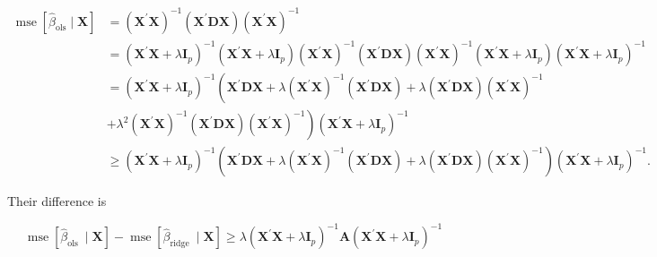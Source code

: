 \documentclass[10pt]{article}
\begin{document}
$$
\begin{aligned}
\operatorname{mse}\left[\widehat{\beta}_{\mathrm{ols}} \mid \boldsymbol{X}\right] &=\left(\boldsymbol{X}^{\prime} \boldsymbol{X}\right)^{-1}\left(\boldsymbol{X}^{\prime} \boldsymbol{D} \boldsymbol{X}\right)\left(\boldsymbol{X}^{\prime} \boldsymbol{X}\right)^{-1} \\
&=\left(\boldsymbol{X}^{\prime} \boldsymbol{X}+\lambda \boldsymbol{I}_{p}\right)^{-1}\left(\boldsymbol{X}^{\prime} \boldsymbol{X}+\lambda \boldsymbol{I}_{p}\right)\left(\boldsymbol{X}^{\prime} \boldsymbol{X}\right)^{-1}\left(\boldsymbol{X}^{\prime} \boldsymbol{D} \boldsymbol{X}\right)\left(\boldsymbol{X}^{\prime} \boldsymbol{X}\right)^{-1}\left(\boldsymbol{X}^{\prime} \boldsymbol{X}+\lambda \boldsymbol{I}_{p}\right)\left(\boldsymbol{X}^{\prime} \boldsymbol{X}+\lambda \boldsymbol{I}_{p}\right)^{-1} \\
&=\left(\boldsymbol{X}^{\prime} \boldsymbol{X}+\lambda \boldsymbol{I}_{p}\right)^{-1}\left(\boldsymbol{X}^{\prime} \boldsymbol{D} \boldsymbol{X}+\lambda\left(\boldsymbol{X}^{\prime} \boldsymbol{X}\right)^{-1}\left(\boldsymbol{X}^{\prime} \boldsymbol{D} \boldsymbol{X}\right)+\lambda\left(\boldsymbol{X}^{\prime} \boldsymbol{D} \boldsymbol{X}\right)\left(\boldsymbol{X}^{\prime} \boldsymbol{X}\right)^{-1}\right.\\
&\left.+\lambda^{2}\left(\boldsymbol{X}^{\prime} \boldsymbol{X}\right)^{-1}\left(\boldsymbol{X}^{\prime} \boldsymbol{D} \boldsymbol{X}\right)\left(\boldsymbol{X}^{\prime} \boldsymbol{X}\right)^{-1}\right)\left(\boldsymbol{X}^{\prime} \boldsymbol{X}+\lambda \boldsymbol{I}_{p}\right)^{-1} \\
& \geq\left(\boldsymbol{X}^{\prime} \boldsymbol{X}+\lambda \boldsymbol{I}_{p}\right)^{-1}\left(\boldsymbol{X}^{\prime} \boldsymbol{D} \boldsymbol{X}+\lambda\left(\boldsymbol{X}^{\prime} \boldsymbol{X}\right)^{-1}\left(\boldsymbol{X}^{\prime} \boldsymbol{D} \boldsymbol{X}\right)+\lambda\left(\boldsymbol{X}^{\prime} \boldsymbol{D} \boldsymbol{X}\right)\left(\boldsymbol{X}^{\prime} \boldsymbol{X}\right)^{-1}\right)\left(\boldsymbol{X}^{\prime} \boldsymbol{X}+\lambda \boldsymbol{I}_{p}\right)^{-1} .
\end{aligned}
$$

Their difference is

$$
\operatorname{mse}\left[\widehat{\beta}_{\text {ols }} \mid \boldsymbol{X}\right]-\operatorname{mse}\left[\widehat{\beta}_{\text {ridge }} \mid \boldsymbol{X}\right] \geq \lambda\left(\boldsymbol{X}^{\prime} \boldsymbol{X}+\lambda \boldsymbol{I}_{p}\right)^{-1} \boldsymbol{A}\left(\boldsymbol{X}^{\prime} \boldsymbol{X}+\lambda \boldsymbol{I}_{p}\right)^{-1}
$$
\end{document}
